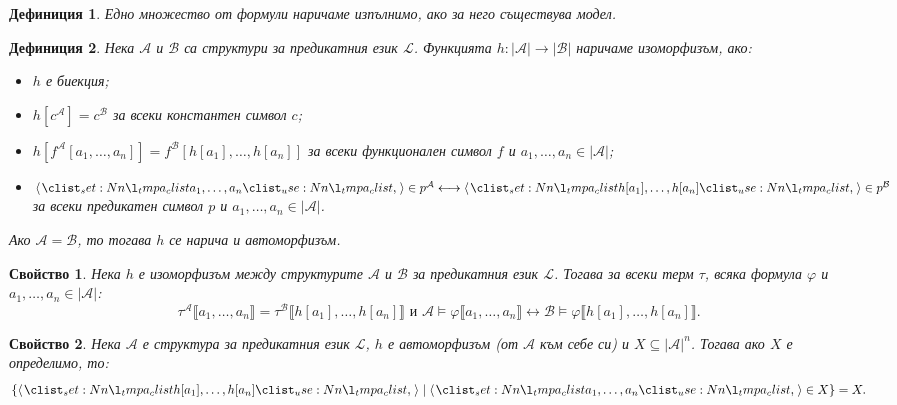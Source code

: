 \documentclass[12pt]{article}
\newcommand{\calA}{\mathcal{A}}
\newcommand{\calL}{\mathcal{L}}
\newcommand{\calB}{\mathcal{B}}
\newcommand{\db}[1]{\llbracket #1 \rrbracket}
\newtheorem*{definition}{Дефиниция}
\newtheorem*{property}{Свойство}
\theoremstyle{definition}
\begin{document}
\begin{definition}
    Едно множество от формули наричаме изпълнимо, ако за него съществува модел.
\end{definition}

\begin{definition}
    Нека $\calA$ и $\calB$ са структури за предикатния език $\calL$.
    Функцията $h : |\calA| \rightarrow |\calB|$ наричаме изоморфизъм, ако:
    \begin{itemize}
        \item $h$ е биекция;
        \item $h[c^\calA] = c^\calB$ за всеки константен символ $c$;
        \item $h[f^\calA[a_1, \dots, a_n]] = f^\calB[h[a_1], \dots, h[a_n]]$ за всеки функционален символ $f$ и $a_1, \dots, a_n \in |\calA|$;
        \item $\opair{a_1, \dots, a_n} \in p^\calA \longleftrightarrow \opair{h[a_1], \dots, h[a_n]} \in p^\calB$ за всеки предикатен символ $p$ и $a_1, \dots, a_n \in |\calA|$.
    \end{itemize}
    Ако $\calA = \calB$, то тогава $h$ се нарича и автоморфизъм.
\end{definition}

\begin{property}
    Нека $h$ е изоморфизъм между структурите $\calA$ и $\calB$ за предикатния език $\calL$.
    Тогава за всеки терм $\tau$, всяка формула $\varphi$ и $a_1, \dots, a_n \in |\calA|$:
    \[
        \tau^\calA\db{a_1, \dots, a_n} = \tau^\calB\db{h[a_1], \dots, h[a_n]} \text{ и } \calA \models \varphi \db{a_1, \dots, a_n} \longleftrightarrow \calB \models \varphi \db{h[a_1], \dots, h[a_n]}.
    \]
\end{property}

\begin{property}
    Нека $\calA$ е структура за предикатния език $\calL$, $h$ е автоморфизъм (от $\calA$ към себе си) и $X \subseteq |\calA|^n$.
    Тогава ако $X$ е определимо, то:
    \[
        \{ \opair{h[a_1], \dots, h[a_n]} \mid \opair{a_1, \dots, a_n} \in X \} = X.
    \]
\end{property}
\end{document}

